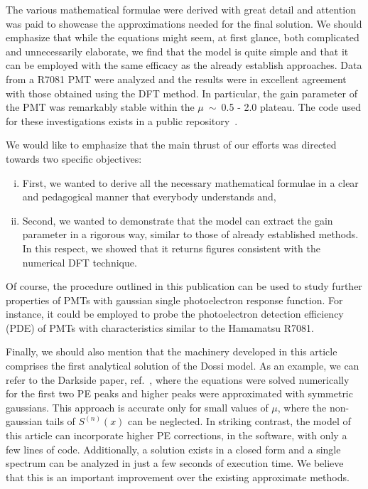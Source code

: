 \documentclass[preprint,12pt]{elsarticle}
\begin{document}
The various mathematical formulae were derived with great detail and attention was paid to showcase the approximations needed for the final solution. 
We should emphasize that while the equations might seem, at first glance, both complicated and unnecessarily elaborate, 
we find that the model is quite simple and that it can be employed with the same efficacy as the already establish approaches. 
Data from a R7081 PMT were analyzed and the results were in excellent agreement with those obtained using the DFT method. 
In particular, the gain parameter of the PMT was remarkably stable within the $\mu$~$\sim$~0.5 - 2.0 plateau. 
The code used for these investigations exists in a public repository~\cite{git}.  

We would like to emphasize that the main thrust of our efforts was directed towards two specific objectives:
\begin{enumerate}[i.]
\item First, we wanted to derive all the necessary mathematical formulae in a clear and pedagogical manner that everybody understands and,
\item Second, we wanted to demonstrate that the model can extract the gain parameter in a rigorous way, similar to those of already established methods. 
In this respect, we showed that it returns figures consistent with the numerical DFT technique.  
\end{enumerate}
Of course, the procedure outlined in this publication can be used to study further properties of PMTs with gaussian single photoelectron response function. 
For instance, it could be employed to probe the photoelectron detection efficiency (PDE) of PMTs with characteristics similar to the Hamamatsu R7081. 

Finally, we should also mention that the machinery developed in this article comprises the first analytical solution of the Dossi model. 
As an example, we can refer to the Darkside paper, ref.~\cite{dark}, where the equations were solved numerically for the first two PE peaks 
and higher peaks were approximated with symmetric gaussians. 
This approach is accurate only for small values of $\mu$, where the non-gaussian tails of $S^{(n)}(x)$ can be neglected. 
In striking contrast, the model of this article can incorporate higher PE corrections, in the software, with only a few lines of code. 
Additionally, a solution exists in a closed form and a single spectrum can be analyzed in just a few seconds of execution time. 
We believe that this is an important improvement over the existing approximate methods.  
\end{document}
